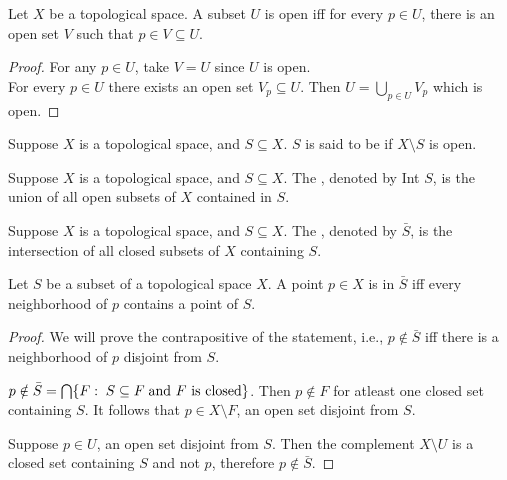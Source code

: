 \documentclass[11pt,a4paper]{article}
\begin{document}
\begin{prop}\label{prop:local_criterion_for_openness}
Let $X$ be a topological space. A subset $U$ is open iff for every $p\in U$, there is an open set $V$ such that $p\in V\subseteq U$.
\end{prop}

\begin{proof}
\forward For any $p\in U$, take $V = U$ since $U$ is open. \\
\converse For every $p\in U$ there exists an open set $V_p\subseteq U$. Then $U = \bigcup_{p\in U} V_p$ which is open.
\end{proof}

\begin{mydef}
Suppose $X$ is a topological space, and $S\subseteq X$. $S$ is said to be  if $X\setminus S$ is open.
\end{mydef}

\begin{mydef}
Suppose $X$ is a topological space, and $S\subseteq X$. The , denoted by Int $S$, is the union of all open subsets of $X$ contained in $S$.
\end{mydef}

\begin{mydef}
Suppose $X$ is a topological space, and $S\subseteq X$. The , denoted by $\bar{S}$, is the intersection of all closed subsets of $X$ containing $S$.
\end{mydef}

\begin{prop}\label{prop:local_characterization_of_closure}
Let $S$ be a subset of a topological space $X$. A point $p\in X$ is in $\bar{S}$ iff every neighborhood of $p$ contains a point of $S$.
\end{prop}

\begin{proof}
We will prove the contrapositive of the statement, i.e., $p\notin \bar{S}$ iff there is a neighborhood of $p$ disjoint from $S$.

\forward $p\notin \bar{S} = \bigcap\{F:\; S\subseteq F\;\text{and ${F}$ is closed}\}$. Then $p\notin F$ for atleast one closed set containing $S$. It follows that $p\in X\setminus F$, an open set disjoint from $S$.

\converse Suppose $p\in U$, an open set disjoint from $S$. Then the complement $X\setminus U$ is a closed set containing $S$ and not $p$, therefore $p\notin \bar{S}$.
\end{proof}
\end{document}
